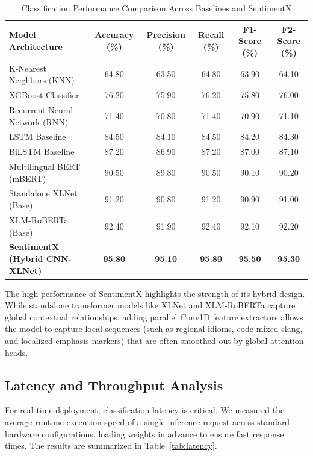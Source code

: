 \documentclass[conference]{IEEEtran}
\begin{document}
\begin{table}[t]
\caption{Classification Performance Comparison Across Baselines and SentimentX}
\label{tab:performance}
\centering
\begin{tabular*}{\textwidth}{@{\extracolsep{\fill}}lccccc}
\toprule
\textbf{Model Architecture} & \textbf{Accuracy (\%)} & \textbf{Precision (\%)} & \textbf{Recall (\%)} & \textbf{F1-Score (\%)} & \textbf{F2-Score (\%)} \\
\midrule
K-Nearest Neighbors (KNN) & 64.80 & 63.50 & 64.80 & 63.90 & 64.10 \\
XGBoost Classifier & 76.20 & 75.90 & 76.20 & 75.80 & 76.00 \\
Recurrent Neural Network (RNN) & 71.40 & 70.80 & 71.40 & 70.90 & 71.10 \\
LSTM Baseline & 84.50 & 84.10 & 84.50 & 84.20 & 84.30 \\
BiLSTM Baseline & 87.20 & 86.90 & 87.20 & 87.00 & 87.10 \\
Multilingual BERT (mBERT) & 90.50 & 89.80 & 90.50 & 90.10 & 90.20 \\
Standalone XLNet (Base) & 91.20 & 90.80 & 91.20 & 90.90 & 91.00 \\
XLM-RoBERTa (Base) & 92.40 & 91.90 & 92.40 & 92.10 & 92.20 \\
\midrule
\textbf{SentimentX (Hybrid CNN-XLNet)} & \textbf{95.80} & \textbf{95.10} & \textbf{95.80} & \textbf{95.50} & \textbf{95.30} \\
\bottomrule
\end{tabular*}
\end{table}

The high performance of SentimentX highlights the strength of its hybrid design. While standalone transformer models like XLNet and XLM-RoBERTa capture global contextual relationships, adding parallel Conv1D feature extractors allows the model to capture local sequences (such as regional idioms, code-mixed slang, and localized emphasis markers) that are often smoothed out by global attention heads.

\subsection{Latency and Throughput Analysis}
For real-time deployment, classification latency is critical. We measured the average runtime execution speed of a single inference request across standard hardware configurations, loading weights in advance to ensure fast response times. The results are summarized in Table~\ref{tab:latency}.
\end{document}
